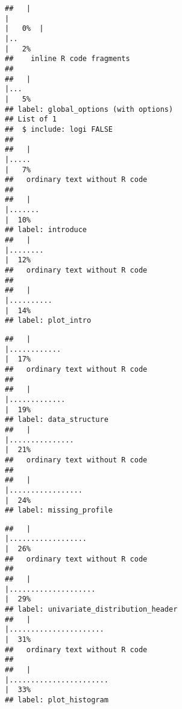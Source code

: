 \documentclass[
]{article}
\begin{document}
\begin{verbatim}
##   |                                                                              |                                                                      |   0%  |                                                                              |..                                                                    |   2%
##    inline R code fragments
## 
##   |                                                                              |...                                                                   |   5%
## label: global_options (with options) 
## List of 1
##  $ include: logi FALSE
## 
##   |                                                                              |.....                                                                 |   7%
##   ordinary text without R code
## 
##   |                                                                              |.......                                                               |  10%
## label: introduce
##   |                                                                              |........                                                              |  12%
##   ordinary text without R code
## 
##   |                                                                              |..........                                                            |  14%
## label: plot_intro
\end{verbatim}

\begin{verbatim}
##   |                                                                              |............                                                          |  17%
##   ordinary text without R code
## 
##   |                                                                              |.............                                                         |  19%
## label: data_structure
##   |                                                                              |...............                                                       |  21%
##   ordinary text without R code
## 
##   |                                                                              |.................                                                     |  24%
## label: missing_profile
\end{verbatim}

\begin{verbatim}
##   |                                                                              |..................                                                    |  26%
##   ordinary text without R code
## 
##   |                                                                              |....................                                                  |  29%
## label: univariate_distribution_header
##   |                                                                              |......................                                                |  31%
##   ordinary text without R code
## 
##   |                                                                              |.......................                                               |  33%
## label: plot_histogram
\end{verbatim}
\end{document}
